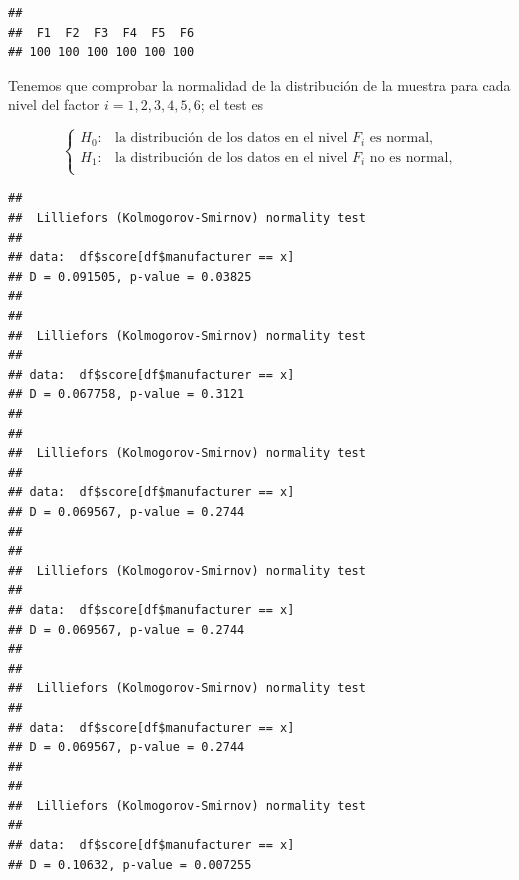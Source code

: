 \documentclass[
]{article}
\newenvironment{Shaded}{\begin{snugshade}}{\end{snugshade}}
\newcommand{\CommentTok}[1]{\textcolor[rgb]{0.56,0.35,0.01}{\textit{#1}}}
\newcommand{\ControlFlowTok}[1]{\textcolor[rgb]{0.13,0.29,0.53}{\textbf{#1}}}
\newcommand{\DataTypeTok}[1]{\textcolor[rgb]{0.13,0.29,0.53}{#1}}
\newcommand{\KeywordTok}[1]{\textcolor[rgb]{0.13,0.29,0.53}{\textbf{#1}}}
\newcommand{\NormalTok}[1]{#1}
\newcommand{\OperatorTok}[1]{\textcolor[rgb]{0.81,0.36,0.00}{\textbf{#1}}}
\begin{document}
\begin{Shaded}
\end{Shaded}

\begin{verbatim}
## 
##  F1  F2  F3  F4  F5  F6 
## 100 100 100 100 100 100
\end{verbatim}

Tenemos que comprobar la normalidad de la distribución de la muestra
para cada nivel del factor \(i=1,2,3,4,5,6\); el test es

\[
\left\{
\begin{array}{ll}
H_0: & \mbox{la distribución de los datos  en el nivel $F_i$ es normal,}\\
H_1: & \mbox{la distribución de los datos en el nivel $F_i$ no es normal,}\\
\end{array}
\right.
\]

\begin{Shaded}
\end{Shaded}

\begin{verbatim}
## 
##  Lilliefors (Kolmogorov-Smirnov) normality test
## 
## data:  df$score[df$manufacturer == x]
## D = 0.091505, p-value = 0.03825
## 
## 
##  Lilliefors (Kolmogorov-Smirnov) normality test
## 
## data:  df$score[df$manufacturer == x]
## D = 0.067758, p-value = 0.3121
## 
## 
##  Lilliefors (Kolmogorov-Smirnov) normality test
## 
## data:  df$score[df$manufacturer == x]
## D = 0.069567, p-value = 0.2744
## 
## 
##  Lilliefors (Kolmogorov-Smirnov) normality test
## 
## data:  df$score[df$manufacturer == x]
## D = 0.069567, p-value = 0.2744
## 
## 
##  Lilliefors (Kolmogorov-Smirnov) normality test
## 
## data:  df$score[df$manufacturer == x]
## D = 0.069567, p-value = 0.2744
## 
## 
##  Lilliefors (Kolmogorov-Smirnov) normality test
## 
## data:  df$score[df$manufacturer == x]
## D = 0.10632, p-value = 0.007255
\end{verbatim}
\end{document}

